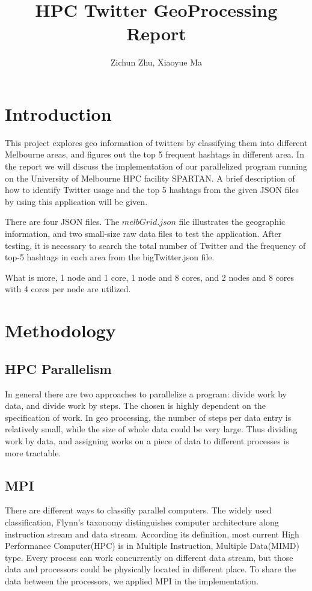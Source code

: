 \documentclass[11pt]{article}
\title{HPC Twitter GeoProcessing Report}
\author
{Zichun Zhu, Xiaoyue Ma}
\begin{document}
\maketitle


\section{Introduction}
This project explores geo information of twitters by classifying them into different Melbourne areas, and figures out the top 5 frequent hashtags in different area. In the report we will discuss the implementation of our parallelized program running on the University of Melbourne HPC facility SPARTAN. A brief description of how to identify Twitter usage and the top 5 hashtags from the given JSON files by using this application will be given.

There are four JSON files. The $melbGrid.json$ file illustrates the geographic information, and two small-size raw data files to test the application. After testing, it is necessary to search the total number of Twitter and the frequency of top-5 hashtags in each area from the bigTwitter.json file.

What is more, 1 node and 1 core, 1 node and 8 cores, and 2 nodes and 8 cores with 4 cores per node are utilized.

\section{Methodology}

\subsection{HPC Parallelism}
In general there are two approaches to parallelize a program: divide work by data, and divide work by steps. The chosen is highly dependent on the specification of work. In geo processing, the number of steps per data entry is relatively small, while the size of whole data could be very large. Thus dividing work by data, and assigning works on a piece of data to different processes is more tractable.

\subsection{MPI}
There are different ways to classifiy parallel computers. The widely used classification, Flynn's taxonomy distinguishes computer architecture along instruction stream and data stream. According its definition, most current High Performance Computer(HPC) is in Multiple Instruction, Multiple Data(MIMD) type. Every process can work concurrently on different data stream, but those data and processors could be physically located in different place. To share the data between the processors,  we applied MPI in the implementation.
\end{document}
